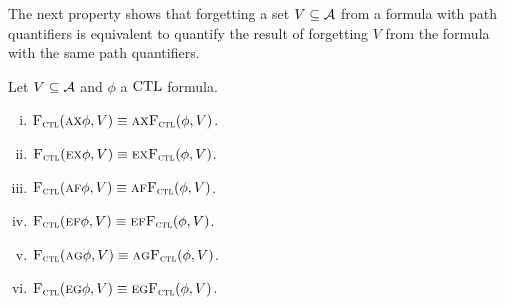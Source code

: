 \documentclass[twoside,11pt]{article}
\begin{document}
The next property shows that forgetting a set $V\subseteq\cal A$ from a formula with path quantifiers is equivalent to quantify the result of forgetting $V$ from the formula with the same path quantifiers.
\begin{proposition}[Homogeneity]\label{pro:ctl:forget:2}
	Let $V\subseteq\cal A$ and $\phi$ a $\textrm{CTL}$ formula.%
	\begin{enumerate}[(i)]
		\item ${\textsc{F}_{\textsc{ctl}}}(\textsc{a}\textsc{x}\phi,V)\equiv \textsc{a}\textsc{x} {\textsc{F}_{\textsc{ctl}}}(\phi,V)$.
		\item ${\textsc{F}_{\textsc{ctl}}}(\textsc{e}\textsc{x}\phi,V)\equiv\textsc{e}\textsc{x} {\textsc{F}_{\textsc{ctl}}}(\phi,V)$.
		\item ${\textsc{F}_{\textsc{ctl}}}(\textsc{a} \textsc{f}\phi,V)\equiv \textsc{a} \textsc{f} {\textsc{F}_{\textsc{ctl}}}(\phi,V)$.
		\item ${\textsc{F}_{\textsc{ctl}}}(\textsc{e}\textsc{f}\phi,V)\equiv\textsc{e}\textsc{f} {\textsc{F}_{\textsc{ctl}}}(\phi,V)$.
		\item ${\textsc{F}_{\textsc{ctl}}}(\textsc{a} \textsc{g}\phi,V)\equiv \textsc{a} \textsc{g}{\textsc{F}_{\textsc{ctl}}}(\phi,V)$.
		\item ${\textsc{F}_{\textsc{ctl}}}(\textsc{e}\textsc{g}\phi,V)\equiv\textsc{e}\textsc{g} {\textsc{F}_{\textsc{ctl}}}(\phi,V)$.
	\end{enumerate}
\end{proposition}
\end{document}

